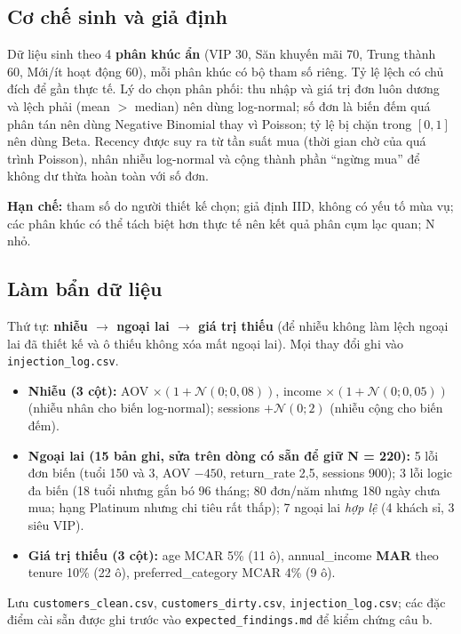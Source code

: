 \documentclass[12pt,a4paper]{article}
\newcommand{\code}[1]{\texttt{#1}}
\begin{document}
\subsection{Cơ chế sinh và giả định}
Dữ liệu sinh theo 4 \textbf{phân khúc ẩn} (VIP 30, Săn khuyến mãi 70, Trung thành 60, Mới/ít hoạt động 60), mỗi phân khúc có bộ tham số riêng. Tỷ lệ lệch có chủ đích để gần thực tế. Lý do chọn phân phối: thu nhập và giá trị đơn luôn dương và lệch phải (mean $>$ median) nên dùng log-normal; số đơn là biến đếm quá phân tán nên dùng Negative Binomial thay vì Poisson; tỷ lệ bị chặn trong $[0,1]$ nên dùng Beta. Recency được suy ra từ tần suất mua (thời gian chờ của quá trình Poisson), nhân nhiễu log-normal và cộng thành phần ``ngừng mua'' để không dư thừa hoàn toàn với số đơn.

\textbf{Hạn chế:} tham số do người thiết kế chọn; giả định IID, không có yếu tố mùa vụ; các phân khúc có thể tách biệt hơn thực tế nên kết quả phân cụm lạc quan; N nhỏ.

\subsection{Làm bẩn dữ liệu}
Thứ tự: \textbf{nhiễu $\to$ ngoại lai $\to$ giá trị thiếu} (để nhiễu không làm lệch ngoại lai đã thiết kế và ô thiếu không xóa mất ngoại lai). Mọi thay đổi ghi vào \code{injection\_log.csv}.
\begin{itemize}
\item \textbf{Nhiễu (3 cột):} AOV $\times(1+\mathcal N(0;0{,}08))$, income $\times(1+\mathcal N(0;0{,}05))$ (nhiễu nhân cho biến log-normal); sessions $+\mathcal N(0;2)$ (nhiễu cộng cho biến đếm).
\item \textbf{Ngoại lai (15 bản ghi, sửa trên dòng có sẵn để giữ N = 220):} 5 lỗi đơn biến (tuổi 150 và 3, AOV $-450$, return\_rate 2,5, sessions 900); 3 lỗi logic đa biến (18 tuổi nhưng gắn bó 96 tháng; 80 đơn/năm nhưng 180 ngày chưa mua; hạng Platinum nhưng chi tiêu rất thấp); 7 ngoại lai \emph{hợp lệ} (4 khách sỉ, 3 siêu VIP).
\item \textbf{Giá trị thiếu (3 cột):} age MCAR 5\% (11 ô), annual\_income \textbf{MAR} theo tenure 10\% (22 ô), preferred\_category MCAR 4\% (9 ô).
\end{itemize}
Lưu \code{customers\_clean.csv}, \code{customers\_dirty.csv}, \code{injection\_log.csv}; các đặc điểm cài sẵn được ghi trước vào \code{expected\_findings.md} để kiểm chứng câu b.

\end{document}
